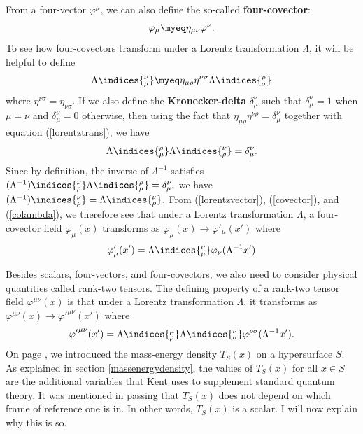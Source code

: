 \documentclass[12pt]{report}
\begin{document}
From a four-vector $\varphi^\mu$, we can also define the so-called \textbf{four-covector}: 
\begin{equation}\label{covector}
	\varphi_\mu\myeq\eta_{\mu\nu}\varphi^\nu.
\end{equation}
To see how four-covectors transform under a Lorentz transformation $\Lambda$, it will be helpful to define 
\begin{equation}\label{colambda}
	\Lambda\indices{_\mu^\nu}\myeq\eta_{\mu\rho}\eta^{\nu\sigma}\Lambda\indices{^\rho_\sigma}
\end{equation}
where %
%
 $\eta^{\nu\sigma}=\eta_{\nu\sigma}$. %
 If we also define the \textbf{Kronecker-delta} $\delta^\nu_\mu$ such%
%
that $\delta^\nu_\mu=1$ when $\mu=\nu$ and $\delta^\nu_\mu=0$ otherwise, then using the fact that $\eta_{\mu\rho}\eta^{\nu\rho}=\delta^\nu_\mu$ together with equation (\ref{lorentztrans}), we have 
\begin{equation}\label{lambdainverse}
\Lambda\indices{^\rho_\mu}\Lambda\indices{_\rho^\nu}=\delta^\nu_\mu.
\end{equation}
Since by definition, the inverse of $\Lambda^{-1}$ satisfies 
$(\Lambda^{-1})\indices{^\nu_\rho}\Lambda\indices{^\rho_\mu}=\delta^\nu_\mu,$
 we have $(\Lambda^{-1})\indices{^\nu_\rho}=\Lambda\indices{_\rho^\nu}.$  From (\ref{lorentzvector}), (\ref{covector}), and (\ref{colambda}), we therefore see that under a Lorentz transformation $\Lambda$, a four-covector field $\varphi_\mu(x)$ transforms as $\varphi_\mu(x)\rightarrow\varphi'_\mu(x')$
where
\begin{equation}\label{lorentzcovector}
\varphi'_\mu(x')=\Lambda\indices{_\mu^\nu}\varphi_\nu(\Lambda^{-1}x')
\end{equation}


Besides scalars, four-vectors, and four-covectors, we also need to consider physical quantities called rank-two tensors. The defining property of a rank-two tensor field $\varphi^{\mu\nu}(x)$ is that under a Lorentz transformation $\Lambda$, it transforms as $\varphi^{\mu\nu}(x)\rightarrow{\varphi'}^{\mu\nu}(x')$ where
\begin{equation}\label{lorentztensor}
{\varphi'}^{\mu\nu}(x')=\Lambda\indices{^\mu_\rho}\Lambda\indices{^\nu_\sigma}\varphi^{\rho\sigma}(\Lambda^{-1}x').
\end{equation}
On page \pageref{massenergydensity}, we introduced the mass-energy density $T_S(x)$ on a hypersurface $S$. As explained in section \ref{massenergydensity}, the values of $T_S(x)$ for all $x\in S$ are the additional variables that Kent uses to supplement standard quantum theory.  It was mentioned in passing that $T_S(x)$ does not depend on which frame of reference one is in. In other words, $T_S(x)$ is a scalar. I will now explain why this is so. 
\end{document}
